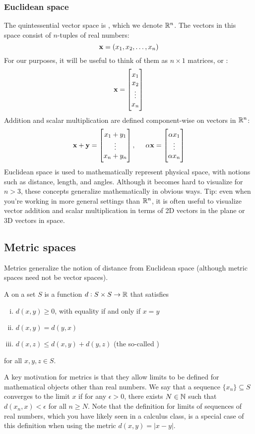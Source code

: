 \subsubsection{Euclidean space}
The quintessential vector space is , which we denote $\mathbb{R}^n$.
The vectors in this space consist of $n$-tuples of real numbers:
\[\mathbf{x} = (x_1, x_2, \dots, x_n)\]
For our purposes, it will be useful to think of them as $n \times 1$ matrices, or :
\[\mathbf{x} = \begin{bmatrix}x_1 \\ x_2 \\ \vdots \\ x_n\end{bmatrix}\]
Addition and scalar multiplication are defined component-wise on vectors in $\mathbb{R}^n$:
\[\mathbf{x} + \mathbf{y} = \begin{bmatrix}x_1 + y_1 \\ \vdots \\ x_n + y_n\end{bmatrix}, \hspace{0.5cm} \alpha\mathbf{x} = \begin{bmatrix}\alpha x_1 \\ \vdots \\ \alpha x_n\end{bmatrix}\]
Euclidean space is used to mathematically represent physical space, with notions such as distance, length, and angles.
Although it becomes hard to visualize for $n > 3$, these concepts generalize mathematically in obvious ways.
Tip: even when you're working in more general settings than $\mathbb{R}^n$, it is often useful to visualize vector addition and scalar multiplication in terms of 2D vectors in the plane or 3D vectors in space.

\subsection{Metric spaces}
Metrics generalize the notion of distance from Euclidean space (although metric spaces need not be vector spaces).

A  on a set $S$ is a function $d : S \times S \to \mathbb{R}$ that satisfies
\begin{enumerate}[(i)]
\item $d(x,y) \geq 0$, with equality if and only if $x = y$
\item $d(x,y) = d(y,x)$
\item $d(x,z) \leq d(x,y) + d(y,z)$ (the so-called )
\end{enumerate}
for all $x, y, z \in S$.

A key motivation for metrics is that they allow limits to be defined for mathematical objects other than real numbers.
We say that a sequence $\{x_n\} \subseteq S$ converges to the limit $x$ if for any $\epsilon > 0$, there exists $N \in \mathbb{N}$ such that $d(x_n, x) < \epsilon$ for all $n \geq N$.
Note that the definition for limits of sequences of real numbers, which you have likely seen in a calculus class, is a special case of this definition when using the metric $d(x, y) = |x-y|$.

